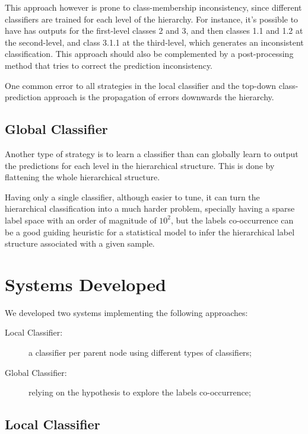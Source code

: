 \documentclass[11pt,a4paper]{article}
\begin{document}
This approach however is prone to class-membership inconsistency, since different classifiers are
trained for each level of the hierarchy. For instance, it's possible to have has outputs for the
first-level classes 2 and 3, and then classes 1.1 and 1.2 at the second-level, and class 3.1.1
at the third-level, which generates an inconsistent classification. This approach should also
be complemented by a post-processing method that tries to correct the prediction inconsistency.

One common error to all strategies in the local classifier and the top-down class-prediction
approach is the propagation of errors downwards the hierarchy.



\subsection{Global Classifier}

Another type of strategy is to learn a classifier than can globally learn to
output the predictions for each level in the hierarchical structure. This is
done by flattening the whole hierarchical structure.

Having only a single classifier, although easier to tune, it can turn the
hierarchical classification into a much harder problem, specially having a
sparse label space with an order of magnitude of $10^2$, but the labels co-occurrence
can be a good guiding heuristic for a statistical model to infer the hierarchical
label structure associated with a given sample.

\section{Systems Developed}\label{system}

We developed two systems implementing the following approaches:

\begin{description}
  \item[Local Classifier:] a classifier per parent node using
  different types of classifiers;
  \item[Global Classifier:] relying on the hypothesis
  to explore the labels co-occurrence;
\end{description}

\subsection{Local Classifier}
\end{document}
